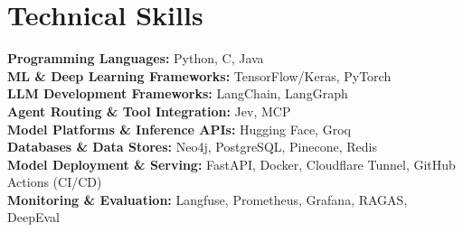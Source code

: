 \documentclass[10pt]{article}
\begin{document}
\section*{Technical Skills}
{\small
\textbf{Programming Languages:} Python, C, Java\\[3pt]
\textbf{ML \& Deep Learning Frameworks:} TensorFlow/Keras, PyTorch\\[3pt]
\textbf{LLM Development Frameworks:} LangChain, LangGraph\\[3pt]
\textbf{Agent Routing \& Tool Integration:} Jev, MCP\\[3pt]
\textbf{Model Platforms \& Inference APIs:} Hugging Face, Groq\\[3pt]
\textbf{Databases \& Data Stores:} Neo4j, PostgreSQL, Pinecone, Redis\\[3pt]
\textbf{Model Deployment \& Serving:} FastAPI, Docker, Cloudflare Tunnel, GitHub Actions (CI/CD)\\[3pt]
\textbf{Monitoring \& Evaluation:} Langfuse, Prometheus, Grafana, RAGAS, DeepEval
}

\end{document}
